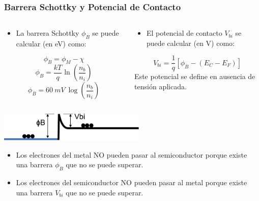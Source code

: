 \documentclass[10pt,t,aspectratio=169]{beamer}
\begin{document}
\begin{frame}[t]
    \frametitle{Barrera Schottky y Potencial de Contacto}

    \begin{columns}
        \begin{column}{0.5\textwidth}
            \begin{itemize}
                \item La barrera Schottky $\phi_B$ se puede calcular (en eV) como:
            \end{itemize}
            \[ \phi_B = \phi_M - \chi \]
            \[ \phi_B = \dfrac{kT}{q}\ln{}\left(\dfrac{n_b}{n_i}\right) \]
            \[ \phi_B = 60\ mV\ \log{}\left(\dfrac{n_b}{n_i}\right) \]
        \end{column}
        \begin{column}{0.5\textwidth}
            \begin{itemize}
                \item El potencial de contacto $V_{bi}$ se puede calcular (en V) como:
            \end{itemize}
            \[ V_{bi} = \dfrac{1}{q}\left[ \phi_B - (E_C - E_F) \right] \]
            Este potencial se define en ausencia de tensión aplicada.
        \end{column}
    \end{columns}

    \vspace{2mm}
    \centering
    \includegraphics[width=7cm]{./figures/contacto-MS-8.pdf}

    \begin{itemize}
        \item Los electrones del metal NO pueden pasar al semiconductor porque existe una barrera $\phi_B$ que no se puede superar.
        \item Los electrones del semiconductor NO pueden pasar al metal porque existe una barrera $V_{bi}$ que no se puede superar.
    \end{itemize}
\end{frame}
\end{document}
